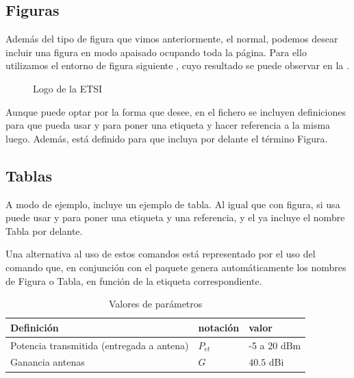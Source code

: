 \subsection{Figuras}

Además del tipo de figura que vimos anteriormente, el normal, podemos desear incluir una figura en modo apaisado ocupando toda la página. Para ello utilizamos el entorno de figura siguiente , cuyo resultado se puede observar en la . 

\begin{figure}
\centering
\caption{Logo de la ETSI}
\end{figure}

Aunque puede optar por la forma que desee, en el fichero  se incluyen definiciones para que pueda usar  y  para poner una etiqueta y hacer referencia a la misma luego. Además, está definido para que  incluya por delante el término Figura.

\subsection{Tablas}
A modo de ejemplo,  incluye un ejemplo de tabla. Al igual que con figura, si usa  puede usar  y  para poner una etiqueta y una referencia, y el  ya incluye el nombre Tabla por delante.

Una alternativa al uso de estos comandos está representado por el uso del comando  que, en conjunción con el paquete  genera automáticamente los nombres de Figura o Tabla, en función de la etiqueta correspondiente.

\begin{table}[h]
\caption{Valores de parámetros}
\begin{center}
\begin{tabular}{p{7cm}p{2cm}p{2cm}} %
Definición & notación & valor\\
 \hline
Potencia transmitida	(entregada a antena) & $P_{et}$ & -5 a 20 dBm	\\
Ganancia antenas & $G$ & $40.5$ dBi\\	
 \hline
\end{tabular}
\end{center}
\end{table}%

